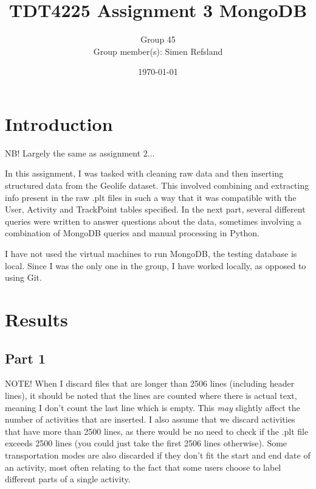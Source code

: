\documentclass[12pt, titlepage]{report}
\title{TDT4225 Assignment 3 MongoDB}
\author{Group 45 \\ Group member(s): Simen Refsland}
\date{\today}
\begin{document}
\maketitle
\pagestyle{fancy}
\newpage
\section*{Introduction}
NB! Largely the same as assignment 2...

In this assignment, I was tasked with cleaning raw data and then inserting structured data from the Geolife dataset. This involved combining and extracting info present in the raw .plt files in such a way that it was compatible with the User, Activity and TrackPoint tables specified. In the next part, several different queries were written to answer questions about the data, sometimes involving a combination of MongoDB queries and manual processing in Python.

I have not used the virtual machines to run MongoDB, the testing database is local. Since I was the only one in the group, I have worked locally, as opposed to using Git.
\section*{Results}
\subsection*{Part 1}

NOTE! When I discard files that are longer than 2506 lines (including header lines), it should be noted that the lines are counted where there is actual text, meaning I don't count the last line which is empty. This \emph{may} slightly affect the number of activities that are inserted. I also assume that we discard activities that have more than 2500 lines, as there would be no need to check if the .plt file exceeds 2500 lines (you could just take the first 2506 lines otherwise). Some transportation modes are also discarded if they don't fit the start and end date of an activity, most often relating to the fact that some users choose to label different parts of a single activity.
\end{document}
